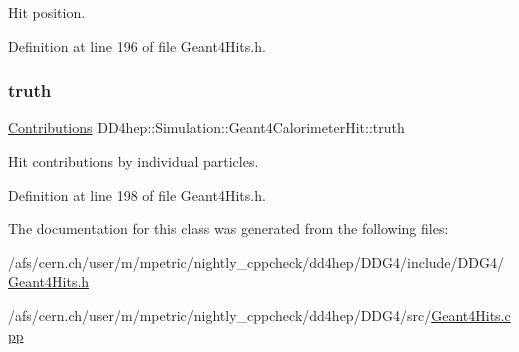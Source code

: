 Hit position. 



Definition at line 196 of file Geant4\+Hits.\+h.

\hypertarget{class_d_d4hep_1_1_simulation_1_1_geant4_calorimeter_hit_a2db0ef9e8d6cfd29213269ccc8d53256}{}\label{class_d_d4hep_1_1_simulation_1_1_geant4_calorimeter_hit_a2db0ef9e8d6cfd29213269ccc8d53256} 
\subsubsection{\texorpdfstring{truth}{truth}}
{\footnotesize\ttfamily \hyperlink{class_d_d4hep_1_1_simulation_1_1_geant4_hit_acdc278ce7e641d337b024d5fc8f52a2c}{Contributions} D\+D4hep\+::\+Simulation\+::\+Geant4\+Calorimeter\+Hit\+::truth}



Hit contributions by individual particles. 



Definition at line 198 of file Geant4\+Hits.\+h.



The documentation for this class was generated from the following files\+:\begin{DoxyCompactItemize}
\item 
/afs/cern.\+ch/user/m/mpetric/nightly\+\_\+cppcheck/dd4hep/\+D\+D\+G4/include/\+D\+D\+G4/\hyperlink{_geant4_hits_8h}{Geant4\+Hits.\+h}\item 
/afs/cern.\+ch/user/m/mpetric/nightly\+\_\+cppcheck/dd4hep/\+D\+D\+G4/src/\hyperlink{_geant4_hits_8cpp}{Geant4\+Hits.\+cpp}\end{DoxyCompactItemize}
